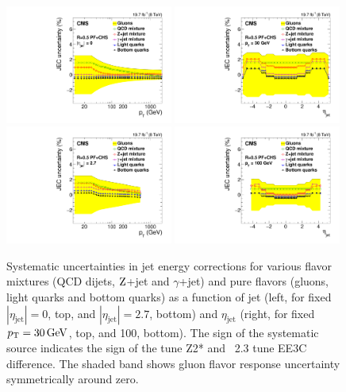 \documentclass[11pt,twoside,a4paper,cmspaper,final,collab]{cms-tdr}
\begin{document}
\begin{figure}[htbp!]
\centering
\includegraphics[width=0.49\textwidth]{Figure_032-a.pdf}
\includegraphics[width=0.49\textwidth]{Figure_032-b.pdf}
\includegraphics[width=0.49\textwidth]{Figure_032-c.pdf}
\includegraphics[width=0.49\textwidth]{Figure_032-d.pdf}
\caption{\label{fig:flavorsys}
Systematic uncertainties in jet energy corrections for various flavor mixtures (QCD dijets, $\mathrm{Z}$+jet and $\gamma$+jet) and pure flavors (gluons, light quarks and bottom quarks) as a function of jet \pt (left, for fixed $|\eta_\text{jet}|=0$, top, and $|\eta_\text{jet}|=2.7$, bottom) and $\eta_\text{jet}$ (right, for fixed $p_{\mathrm{T}}=30\,\text{Ge\hspace{-.08em}V}$, top, and 100\GeV, bottom).
The sign of the systematic source indicates the sign of the  tune Z2* and \HERWIGpp~2.3 tune EE3C difference. The shaded band shows gluon flavor response uncertainty symmetrically around zero.
}
\end{figure}
\end{document}
